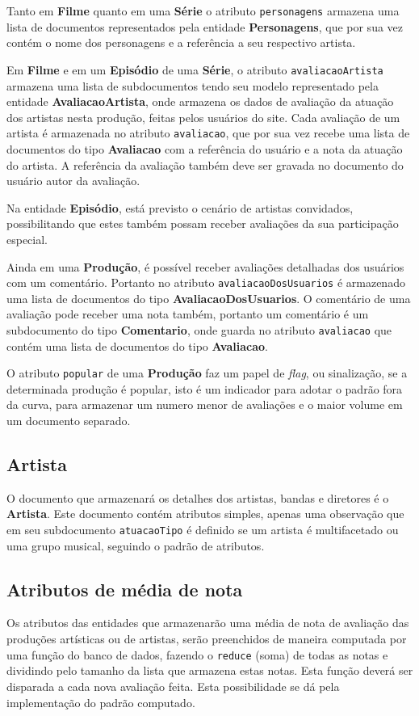 \documentclass[
	12pt,				%
	openright,			%
	oneside,			%
	a4paper,			%
	english,			%
	french,				%
	spanish,			%
	brazil,				%
	]{abntex2}
\begin{document}
Tanto em \textbf{Filme} quanto em uma \textbf{Série} o atributo \verb+personagens+ armazena uma lista de documentos representados pela entidade \textbf{Personagens}, que por sua vez contém o nome dos personagens e a referência a seu respectivo artista.

Em \textbf{Filme} e em um \textbf{Episódio} de uma \textbf{Série}, o atributo \verb+avaliacaoArtista+  armazena uma lista de subdocumentos tendo seu modelo representado pela entidade \textbf{AvaliacaoArtista}, onde armazena os dados de avaliação da atuação dos artistas nesta produção, feitas pelos usuários do site. Cada avaliação de um artista é armazenada no atributo \verb+avaliacao+, que por sua vez recebe uma lista de documentos do tipo \textbf{Avaliacao} com a referência do usuário e a nota da atuação do artista. A referência da avaliação também deve ser gravada no documento do usuário autor da avaliação.

Na entidade \textbf{Episódio}, está previsto o cenário de artistas convidados, possibilitando que estes também possam receber avaliações da sua participação especial.

Ainda em uma \textbf{Produção}, é possível receber avaliações detalhadas dos usuários com um comentário. Portanto no atributo \verb+avaliacaoDosUsuarios+ é armazenado uma lista de documentos do tipo \textbf{AvaliacaoDosUsuarios}. O comentário de uma avaliação pode receber uma nota também, portanto um comentário é um subdocumento do tipo \textbf{Comentario}, onde guarda no atributo \verb+avaliacao+ que contém uma lista de documentos do tipo \textbf{Avaliacao}.

O atributo \verb+popular+ de uma \textbf{Produção} faz um papel de \textit{flag}, ou sinalização, se a determinada produção é popular, isto é um indicador para adotar o padrão fora da curva, para armazenar um numero menor de avaliações e o maior volume em um documento separado.

\subsection{Artista}
O documento que armazenará os detalhes dos artistas, bandas e diretores é o \textbf{Artista}. Este documento contém atributos simples, apenas uma observação que em seu subdocumento \verb+atuacaoTipo+ é definido se um artista é multifacetado ou uma grupo musical, seguindo o padrão de atributos.

\subsection{Atributos de média de nota}
Os atributos das entidades que armazenarão uma média de nota de avaliação das produções artísticas ou de artistas, serão preenchidos de maneira computada por uma função do banco de dados, fazendo o \verb+reduce+ (soma) de todas as notas e dividindo pelo tamanho da lista que armazena estas notas. Esta função deverá ser disparada a cada nova avaliação feita. Esta possibilidade se dá pela implementação do padrão computado.
\end{document}

